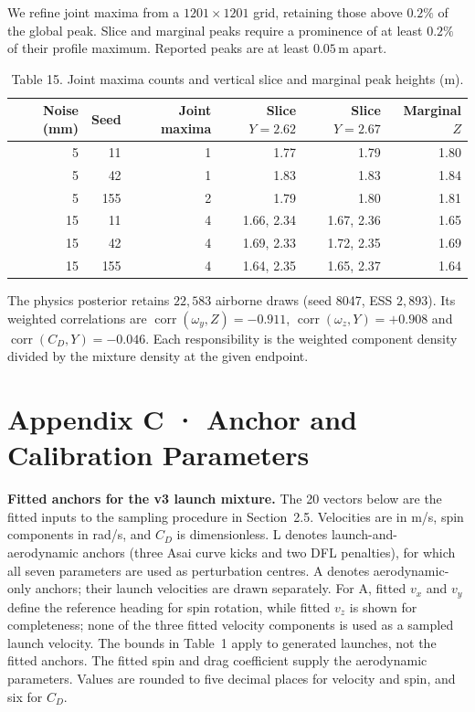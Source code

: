 We refine joint maxima from a $1201\times1201$ grid, retaining those above $0.2\%$ of the global peak. Slice and marginal peaks require a prominence of at least $0.2\%$ of their profile maximum. Reported peaks are at least $0.05\,\mathrm{m}$ apart.

\begin{table}[H]
  
  
  \caption{Table 15. Joint maxima counts and vertical slice and marginal peak heights (m).}
  \begin{tabular}{rrrrrr}
    \toprule
    Noise (mm) & Seed & Joint maxima & Slice $Y=2.62$ & Slice $Y=2.67$ & Marginal $Z$ \\
    \midrule
    5 & 11 & 1 & 1.77 & 1.79 & 1.80 \\
    5 & 42 & 1 & 1.83 & 1.83 & 1.84 \\
    5 & 155 & 2 & 1.79 & 1.80 & 1.81 \\
    15 & 11 & 4 & 1.66, 2.34 & 1.67, 2.36 & 1.65 \\
    15 & 42 & 4 & 1.69, 2.33 & 1.72, 2.35 & 1.69 \\
    15 & 155 & 4 & 1.64, 2.35 & 1.65, 2.37 & 1.64 \\
    \bottomrule
  \end{tabular}
\end{table}

The physics posterior retains $22{,}583$ airborne draws (seed 8047, ESS $2{,}893$). Its weighted correlations are $\operatorname{corr}(\omega_y,Z)=-0.911$, $\operatorname{corr}(\omega_z,Y)=+0.908$ and $\operatorname{corr}(C_D,Y)=-0.046$. Each responsibility is the weighted component density divided by the mixture density at the given endpoint.

\section*{Appendix C · Anchor and Calibration Parameters}

\begingroup

\textbf{Fitted anchors for the v3 launch mixture.} The 20 vectors below are the fitted inputs to the sampling procedure in Section~2.5. Velocities are in m/s, spin components in rad/s, and $C_D$ is dimensionless. L denotes launch-and-aerodynamic anchors (three Asai curve kicks and two DFL penalties), for which all seven parameters are used as perturbation centres. A denotes aerodynamic-only anchors; their launch velocities are drawn separately. For A, fitted $v_x$ and $v_y$ define the reference heading for spin rotation, while fitted $v_z$ is shown for completeness; none of the three fitted velocity components is used as a sampled launch velocity. The bounds in Table~1 apply to generated launches, not the fitted anchors. The fitted spin and drag coefficient supply the aerodynamic parameters. Values are rounded to five decimal places for velocity and spin, and six for $C_D$.

